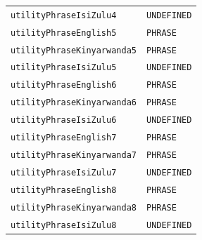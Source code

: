 \documentclass{CSSRforAfrica}
\begin{document}
\begin{table}[H]
\begin{tabular}{l l}
{\footnotesize \verb+utilityPhraseIsiZulu4+}             & {\footnotesize \verb+UNDEFINED+ }\vspace{-1.5mm} \\
{\footnotesize \verb+utilityPhraseEnglish5+}             & {\footnotesize \verb+PHRASE+ } \vspace{-1.5mm}  \\
{\footnotesize \verb+utilityPhraseKinyarwanda5+}    & {\footnotesize \verb+PHRASE+}  \vspace{-1.5mm} \\
{\footnotesize \verb+utilityPhraseIsiZulu5+}             & {\footnotesize \verb+UNDEFINED+ }\vspace{-1.5mm} \\
{\footnotesize \verb+utilityPhraseEnglish6+}             & {\footnotesize \verb+PHRASE+ } \vspace{-1.5mm}  \\
{\footnotesize \verb+utilityPhraseKinyarwanda6+}    & {\footnotesize \verb+PHRASE+}  \vspace{-1.5mm} \\
{\footnotesize \verb+utilityPhraseIsiZulu6+}             & {\footnotesize \verb+UNDEFINED+ }\vspace{-1.5mm} \\
{\footnotesize \verb+utilityPhraseEnglish7+}             & {\footnotesize \verb+PHRASE+ } \vspace{-1.5mm}  \\
{\footnotesize \verb+utilityPhraseKinyarwanda7+}    & {\footnotesize \verb+PHRASE+}  \vspace{-1.5mm} \\
{\footnotesize \verb+utilityPhraseIsiZulu7+}             & {\footnotesize \verb+UNDEFINED+ }\vspace{-1.5mm} \\
{\footnotesize \verb+utilityPhraseEnglish8+}             & {\footnotesize \verb+PHRASE+ } \vspace{-1.5mm}  \\
{\footnotesize \verb+utilityPhraseKinyarwanda8+}    & {\footnotesize \verb+PHRASE+}  \vspace{-1.5mm} \\
{\footnotesize \verb+utilityPhraseIsiZulu8+}             & {\footnotesize \verb+UNDEFINED+ }\vspace{-1.5mm} \\

\end{tabular}
\end{table}
\end{document}
